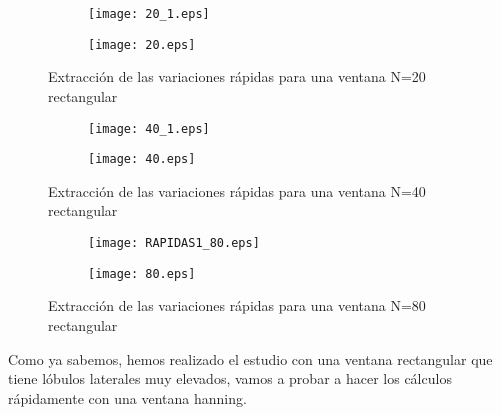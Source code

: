 \documentclass{article}
\begin{document}
        \begin{figure}[h]
                \centering
                \begin{subfigure}
                    \centering          \texttt{[image: 20\_1.eps]}
               \end{subfigure}
               \begin{subfigure}
                    \centering          \texttt{[image: 20.eps]}
               \end{subfigure}    
               \caption{Extracción de las variaciones rápidas para una ventana N=20 rectangular}
                \label{fig:sup_rugosas}
        \end{figure}
        \begin{figure}[h]
                \centering
                \begin{subfigure}
                    \centering          \texttt{[image: 40\_1.eps]}
               \end{subfigure}
               \begin{subfigure}
                    \centering          \texttt{[image: 40.eps]}
               \end{subfigure}    
               \caption{Extracción de las variaciones rápidas para una ventana N=40 rectangular}
                \label{fig:sup_rugosas}
        \end{figure}
        \clearpage
        \begin{figure}[h]
                \centering
                \begin{subfigure}
                    \centering          \texttt{[image: RAPIDAS1\_80.eps]}
               \end{subfigure}
               \begin{subfigure}
                    \centering          \texttt{[image: 80.eps]}
               \end{subfigure}    
               \caption{Extracción de las variaciones rápidas para una ventana N=80 rectangular}
                \label{fig:sup_rugosas}
        \end{figure}

    \par Como ya sabemos, hemos realizado el estudio con una ventana rectangular que tiene lóbulos laterales muy elevados, vamos a probar a hacer los cálculos rápidamente con una ventana hanning.
    
\end{document}
